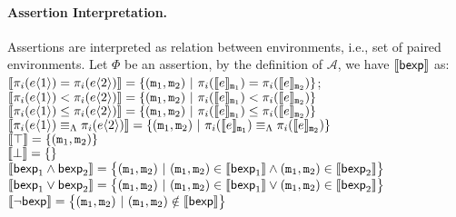 \documentclass[a4paper,11pt]{article}
\begin{document}
\paragraph{Assertion Interpretation.} Assertions are interpreted as relation between environments, i.e., set of paired environments. Let $\Phi$ be an assertion,
%
by the definition of $\mathcal{A}$, we have $\llbracket \mathsf{bexp} \rrbracket$ as:
\\
$\llbracket \pi_i(e\langle 1 \rangle) 
= \pi_i(e\langle 2 \rangle) \rrbracket = 
\{(\mathtt{m}_1, \mathtt{m}_2) ~|~ \pi_{i}(\llbracket e \rrbracket_{\mathtt{m}_{1}}) 
= \pi_i(\llbracket e \rrbracket_{\mathtt{m}_2}) \}$;
%
\\
$\llbracket \pi_i(e\langle 1 \rangle) 
< \pi_i(e\langle 2 \rangle) \rrbracket = 
\{(\mathtt{m}_1, \mathtt{m}_2) ~|~ \pi_{i}(\llbracket e \rrbracket_{\mathtt{m}_{1}}) 
< \pi_i(\llbracket e \rrbracket_{\mathtt{m}_2}) \}$
%
\\
$\llbracket \pi_i(e\langle 1 \rangle) 
\leq \pi_i(e\langle 2 \rangle) \rrbracket = 
\{(\mathtt{m}_1, \mathtt{m}_2) ~|~ \pi_{i}(\llbracket e \rrbracket_{\mathtt{m}_{1}}) 
\leq \pi_i(\llbracket e \rrbracket_{\mathtt{m}_2}) \}$
%
\\
$\llbracket \pi_i(e\langle 1 \rangle) 
\equiv_{\Lambda} \pi_i(e\langle 2 \rangle) \rrbracket = 
\{(\mathtt{m}_1, \mathtt{m}_2) ~|~ \pi_{i}(\llbracket e \rrbracket_{\mathtt{m}_{1}}) 
\equiv_{\Lambda} \pi_i(\llbracket e \rrbracket_{\mathtt{m}_2}) \}$
%
\\
$\llbracket \top \rrbracket = \{(\mathtt{m}_1, \mathtt{m}_2)\}$
%
\\
$\llbracket \bot \rrbracket = \{\}$
%
\\
$\llbracket \mathsf{bexp}_1 \land \mathsf{bexp}_2 \rrbracket = \big\{(\mathtt{m}_1, \mathtt{m}_2)
~|~ (\mathtt{m}_1, \mathtt{m}_2) \in \llbracket \mathsf{bexp}_1 \rrbracket \land 
	(\mathtt{m}_1, \mathtt{m}_2) \in \llbracket \mathsf{bexp}_2 \rrbracket \big\}$
%
\\
$\llbracket \mathsf{bexp}_1 \lor \mathsf{bexp}_2 \rrbracket = \big\{(\mathtt{m}_1, \mathtt{m}_2)
~|~ (\mathtt{m}_1, \mathtt{m}_2) \in \llbracket \mathsf{bexp}_1 \rrbracket \lor 
	(\mathtt{m}_1, \mathtt{m}_2) \in \llbracket \mathsf{bexp}_2 \rrbracket \big\}$
%
\\
$\llbracket \neg \mathsf{bexp} \rrbracket = \big\{(\mathtt{m}_1, \mathtt{m}_2)
~|~ (\mathtt{m}_1, \mathtt{m}_2) \notin \llbracket \mathsf{bexp} \rrbracket \big\}$
%
%
\end{document}
